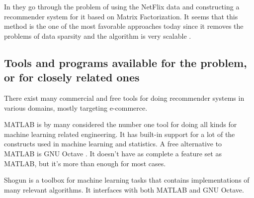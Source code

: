 \documentclass[a4paper,11pt]{article}
\begin{document}
In \cite{factorin} they go through the problem of using the NetFlix data and constructing a recommender system for it based on Matrix Factorization. It seems that this method is the one of the most favorable approaches today since it removes the problems of data sparsity and the algorithm is very scalable \cite{factorin}.

\subsection{Tools and programs available for the problem, or for closely related ones}
There exist many commercial and free tools for doing recommender systems in various domains, mostly targeting e-commerce.

MATLAB \cite{matlab-ml} is by many considered
the number one tool for doing all kinds for machine learning related engineering. It has built-in support for a lot of the constructs used in
machine learning and statistics. A free alternative to MATLAB is GNU Octave \cite{octave}. It doesn't have as complete a feature set
as MATLAB, but it's more than enough for most cases.

Shogun \cite{shogun} is a toolbox for machine learning tasks that contains implementations of many relevant algorithms. It interfaces with both MATLAB
and GNU Octave.




\end{document}
